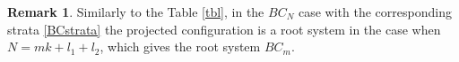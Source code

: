 \documentclass[12pt]{amsart}
\numberwithin{equation}{section}
\newtheorem{theorem}{Theorem}[section]
\theoremstyle{definition}
\newtheorem{remark}[theorem]{Remark}
\begin{document}
\begin{remark}
    Similarly to the Table \ref{tbl}, in the $BC_N$ case with the corresponding strata \eqref{BCstrata} the projected configuration is a root system in the case when $N = m k + l_1 + l_2$, which gives the root system $BC_m$.
\end{remark}



\end{document}
